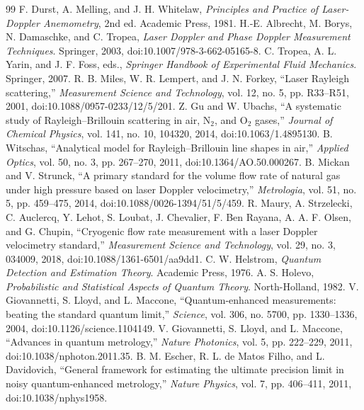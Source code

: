 \documentclass[a4paper,11pt]{article}
\numberwithin{equation}{section}
\begin{document}
\begin{thebibliography}{99}
 F. Durst, A. Melling, and J. H. Whitelaw, \emph{Principles and Practice of Laser-Doppler Anemometry}, 2nd ed. Academic Press, 1981.
 H.-E. Albrecht, M. Borys, N. Damaschke, and C. Tropea, \emph{Laser Doppler and Phase Doppler Measurement Techniques}. Springer, 2003, doi:10.1007/978-3-662-05165-8.
 C. Tropea, A. L. Yarin, and J. F. Foss, eds., \emph{Springer Handbook of Experimental Fluid Mechanics}. Springer, 2007.
 R. B. Miles, W. R. Lempert, and J. N. Forkey, ``Laser Rayleigh scattering,'' \emph{Measurement Science and Technology}, vol. 12, no. 5, pp. R33--R51, 2001, doi:10.1088/0957-0233/12/5/201.
 Z. Gu and W. Ubachs, ``A systematic study of Rayleigh--Brillouin scattering in air, N$_2$, and O$_2$ gases,'' \emph{Journal of Chemical Physics}, vol. 141, no. 10, 104320, 2014, doi:10.1063/1.4895130.
 B. Witschas, ``Analytical model for Rayleigh--Brillouin line shapes in air,'' \emph{Applied Optics}, vol. 50, no. 3, pp. 267--270, 2011, doi:10.1364/AO.50.000267.
 B. Mickan and V. Strunck, ``A primary standard for the volume flow rate of natural gas under high pressure based on laser Doppler velocimetry,'' \emph{Metrologia}, vol. 51, no. 5, pp. 459--475, 2014, doi:10.1088/0026-1394/51/5/459.
 R. Maury, A. Strzelecki, C. Auclercq, Y. Lehot, S. Loubat, J. Chevalier, F. Ben Rayana, A. A. F. Olsen, and G. Chupin, ``Cryogenic flow rate measurement with a laser Doppler velocimetry standard,'' \emph{Measurement Science and Technology}, vol. 29, no. 3, 034009, 2018, doi:10.1088/1361-6501/aa9dd1.
 C. W. Helstrom, \emph{Quantum Detection and Estimation Theory}. Academic Press, 1976.
 A. S. Holevo, \emph{Probabilistic and Statistical Aspects of Quantum Theory}. North-Holland, 1982.
 V. Giovannetti, S. Lloyd, and L. Maccone, ``Quantum-enhanced measurements: beating the standard quantum limit,'' \emph{Science}, vol. 306, no. 5700, pp. 1330--1336, 2004, doi:10.1126/science.1104149.
 V. Giovannetti, S. Lloyd, and L. Maccone, ``Advances in quantum metrology,'' \emph{Nature Photonics}, vol. 5, pp. 222--229, 2011, doi:10.1038/nphoton.2011.35.
 B. M. Escher, R. L. de Matos Filho, and L. Davidovich, ``General framework for estimating the ultimate precision limit in noisy quantum-enhanced metrology,'' \emph{Nature Physics}, vol. 7, pp. 406--411, 2011, doi:10.1038/nphys1958.

\end{thebibliography}
\end{document}
